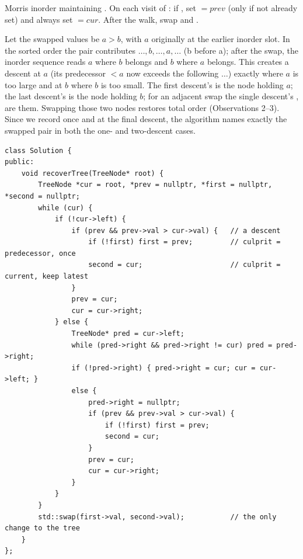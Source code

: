 Morris inorder maintaining . On each visit of : if
, set $=\mathit{prev}$ (only if not
already set) and always set $=\mathit{cur}$. After the walk, swap
 and .

\begin{proofbox}
Let the swapped values be $a>b$, with $a$ originally at the earlier inorder slot. In the
sorted order the pair contributes $\ldots, b, \ldots, a, \ldots$ (b before a); after the
swap, the inorder sequence reads $a$ where $b$ belongs and $b$ where $a$ belongs. This
creates a descent at $a$ (its predecessor $<a$ now exceeds the following $\ldots$) exactly
where $a$ is too large and at $b$ where $b$ is too small. The first descent's 
is the node holding $a$; the last descent's  is the node holding $b$; for an
adjacent swap the single descent's , are them. Swapping those two
nodes restores total order (Observations 2--3). Since we record  once and
 at the final descent, the algorithm names exactly the swapped pair in both
the one- and two-descent cases.
\end{proofbox}

\begin{lstlisting}[caption={Recover BST via Morris (LeetCode 99)}, label={lst:c03-recover}]
class Solution {
public:
    void recoverTree(TreeNode* root) {
        TreeNode *cur = root, *prev = nullptr, *first = nullptr, *second = nullptr;
        while (cur) {
            if (!cur->left) {
                if (prev && prev->val > cur->val) {   // a descent
                    if (!first) first = prev;         // culprit = predecessor, once
                    second = cur;                     // culprit = current, keep latest
                }
                prev = cur;
                cur = cur->right;
            } else {
                TreeNode* pred = cur->left;
                while (pred->right && pred->right != cur) pred = pred->right;
                if (!pred->right) { pred->right = cur; cur = cur->left; }
                else {
                    pred->right = nullptr;
                    if (prev && prev->val > cur->val) {
                        if (!first) first = prev;
                        second = cur;
                    }
                    prev = cur;
                    cur = cur->right;
                }
            }
        }
        std::swap(first->val, second->val);           // the only change to the tree
    }
};
\end{lstlisting}

